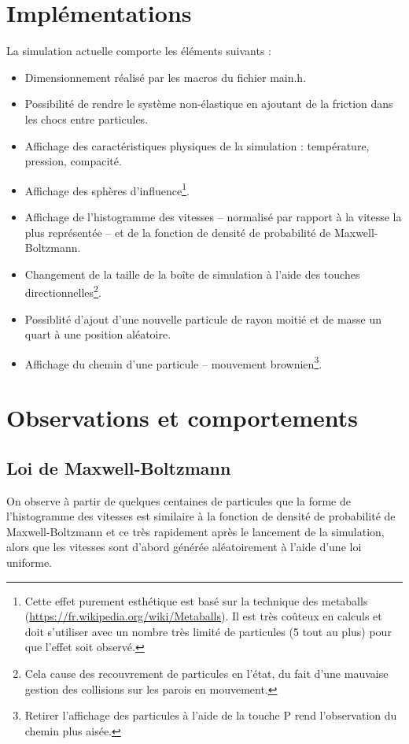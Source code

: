 \documentclass{tufte-handout}
\begin{document}
  \section{Implémentations}
  La simulation actuelle comporte les éléments suivants :
  \begin{itemize}
    \item Dimensionnement réalisé par les macros du fichier main.h.

    \item Possibilité de rendre le système non-élastique en ajoutant de la friction dans les chocs entre particules.

    \item Affichage des caractéristiques physiques de la simulation : température, pression, compacité.

    \item Affichage des sphères d'influence\footnote{Cette effet purement esthétique est basé sur la technique des metaballs (\url{https://fr.wikipedia.org/wiki/Metaballs}). Il est très coûteux en calculs et doit s'utiliser avec un nombre très limité de particules (5 tout au plus) pour que l'effet soit observé.}.

    \item Affichage de l'histogramme des vitesses – normalisé par rapport à la vitesse la plus représentée – et de la fonction de densité de probabilité de Maxwell-Boltzmann.

    \item Changement de la taille de la boîte de simulation à l'aide des touches directionnelles\footnote{Cela cause des recouvrement de particules en l'état, du fait d'une mauvaise gestion des collisions sur les parois en mouvement.}.

    \item Possiblité d'ajout d'une nouvelle particule de rayon moitié et de masse un quart à une position aléatoire.

    \item Affichage du chemin d'une particule -- mouvement brownien\footnote{Retirer l'affichage des particules à l'aide de la touche P rend l'observation du chemin plus aisée.}.
  \end{itemize}

  \section{Observations et comportements}
  \subsection{Loi de Maxwell-Boltzmann}
  On observe à partir de quelques centaines de particules que la forme de l'histogramme des vitesses est similaire à la fonction de densité de probabilité de Maxwell-Boltzmann et ce très rapidement après le lancement de la simulation, alors que les vitesses sont d'abord générée aléatoirement à l'aide d'une loi uniforme.
\end{document}
